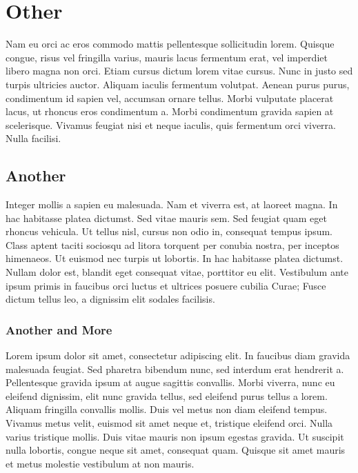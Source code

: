 
\section{Other}
\label{sec:Other}

Nam eu orci ac eros commodo mattis pellentesque sollicitudin lorem. Quisque congue, risus vel fringilla varius, mauris lacus fermentum erat, vel imperdiet libero magna non orci. Etiam cursus dictum lorem vitae cursus. Nunc in justo sed turpis ultricies auctor. Aliquam iaculis fermentum volutpat. Aenean purus purus, condimentum id sapien vel, accumsan ornare tellus. Morbi vulputate placerat lacus, ut rhoncus eros condimentum a. Morbi condimentum gravida sapien at scelerisque. Vivamus feugiat nisi et neque iaculis, quis fermentum orci viverra. Nulla facilisi.

\subsection{Another}

Integer mollis a sapien eu malesuada. Nam et viverra est, at laoreet magna. In hac habitasse platea dictumst. Sed vitae mauris sem. Sed feugiat quam eget rhoncus vehicula. Ut tellus nisl, cursus non odio in, consequat tempus ipsum. Class aptent taciti sociosqu ad litora torquent per conubia nostra, per inceptos himenaeos. Ut euismod nec turpis ut lobortis. In hac habitasse platea dictumst. Nullam dolor est, blandit eget consequat vitae, porttitor eu elit. Vestibulum ante ipsum primis in faucibus orci luctus et ultrices posuere cubilia Curae; Fusce dictum tellus leo, a dignissim elit sodales facilisis.

\subsubsection{Another and More}

Lorem ipsum dolor sit amet, consectetur adipiscing elit. In faucibus diam gravida malesuada feugiat. Sed pharetra bibendum nunc, sed interdum erat hendrerit a. Pellentesque gravida ipsum at augue sagittis convallis. Morbi viverra, nunc eu eleifend dignissim, elit nunc gravida tellus, sed eleifend purus tellus a lorem. Aliquam fringilla convallis mollis. Duis vel metus non diam eleifend tempus. Vivamus metus velit, euismod sit amet neque et, tristique eleifend orci. Nulla varius tristique mollis. Duis vitae mauris non ipsum egestas gravida. Ut suscipit nulla lobortis, congue neque sit amet, consequat quam. Quisque sit amet mauris et metus molestie vestibulum at non mauris.
